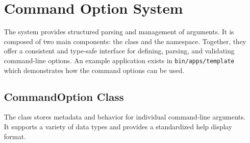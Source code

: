 \section{Command Option System}\label{section:cmd_option_system}

The  system provides structured parsing and management of  arguments. It is composed of two main components: the  class and the  namespace. Together, they offer a consistent and type-safe interface for defining, parsing, and validating command-line options. An example application exists in \texttt{bin/apps/template} which demonstrates how the command options can be used.

\subsection{CommandOption Class}

The  class stores metadata and behavior for individual command-line arguments. It supports a variety of data types and provides a standardized help display format.

